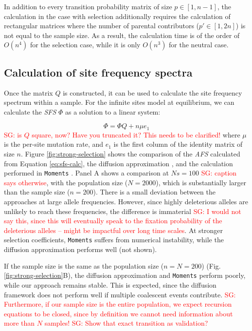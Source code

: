 \documentclass[review]{elsarticle}
\newcommand{\sgcomment}[1]{\textcolor{red}{SG: #1}}
\begin{document}
In addition to every transition probability matrix of size $p \in [1, n-1]$, the calculation in the
case with selection additionally requires the calculation of rectangular matrices where the number
of parental contributors ($p' \in [1, 2n]$) is not equal to the sample size. As a result, the
calculation time is of the order of $O(n^4)$ for the selection case, while it is only $O(n^3)$ for
the neutral case.

\subsection{Calculation of site frequency spectra}
\label{subsec:afs}

Once the matrix $Q$ is constructed, it can be used to calculate the site frequency spectrum within a
sample. For the infinite sites model at equilibrium, we can calculate the \textit{SFS} $\Phi$ as a
solution to a linear system:

\begin{equation}
  \label{eq:sfs-calc}
\Phi = \Phi Q + n \mu e_1
\end{equation}
\sgcomment{is $Q$ square, now? Have you truncated it? This needs to be clarified!}
where $\mu$ is the per-site mutation rate, and $e_1$ is the first column of the identity matrix of
size $n$. Figure \ref{fig:strong-selection} shows the comparison of the \textit{AFS} calculated from
Equation \eqref{eq:sfs-calc}, the diffusion approximation \cite[eq. 9.23]{Ewens2004}, and the calculation
performed in \texttt{Moments} \cite{JouganousEtAl2017}. Panel A shows a comparison at $Ns=100$ \sgcomment{caption says otherwise}, with
the population size ($N=2000$), which is substantially larger than the sample size ($n=200$). There
is a small deviation between the approaches at large allele frequencies. However, since highly
deleterious alleles are unlikely to reach these frequencies, the difference is immaterial \sgcomment{I would not say this, since this will eventually speak to the fixation probability of the deleterious alleles -- might be impactful over long time scales}. At
stronger selection coefficients, \texttt{Moments} suffers from numerical instability, while the
diffusion approximation performs well (not shown).

If the sample size is the same as the population size ($n=N=200$) (Fig.
\ref{fig:strong-selection}B), the diffusion approximation and \texttt{Moments} perform poorly, while
our approach remains stable. This is expected, since the diffusion framework does not perform well
if multiple coalescent events contribute. \sgcomment{Furthermore, if our sample size is the entire population, we expect recursion equations to be closed, since by definition we cannot need information about more than $N$ samples!}
\sgcomment{Show that exact transition as validation?}
\end{document}

